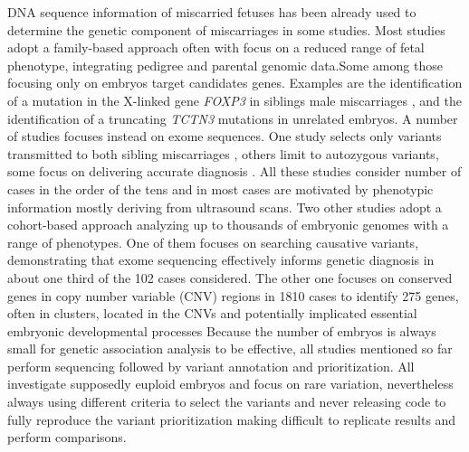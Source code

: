 DNA sequence information of miscarried fetuses has been already used to determine the genetic component of miscarriages in some studies\cite{rajcan2020next, filges2015exome}. Most studies adopt a family-based approach often with focus on a reduced range of fetal phenotype, integrating pedigree and parental genomic data\cite{bondeson2017nonsense, dohrn2015ecel1,wilbe2015musk, cristofoli2017novel}.Some among those focusing only on embryos target candidates genes. Examples are the identification of a mutation in the X-linked gene \textit{FOXP3} in siblings male miscarriages \cite{rae2015novel}, and the identification of a truncating \textit{TCTN3} mutations in unrelated embryos\cite{thomas2012tctn3}. A number of studies focuses instead on exome sequences\cite{shamseldin2015identification, qiao2016whole,fu2018whole, meier2019exome, yates2017whole}. One study selects only variants transmitted to both sibling miscarriages \cite{qiao2016whole}, others limit to autozygous variants\cite{thomas2012tctn3, shamseldin2015identification}, some focus on delivering accurate diagnosis \cite{meier2019exome}. All these studies consider number of cases in the order of the tens and in most cases are motivated by phenotypic information mostly deriving from ultrasound scans. 
Two other studies adopt a cohort-based approach analyzing up to thousands of embryonic genomes with a range of phenotypes\cite{chen2017characterization,zhao2020exome}. One of them focuses on  searching causative variants, demonstrating that exome sequencing effectively informs genetic diagnosis in about one third of the 102 cases considered\cite{zhao2020exome}. The other one focuses on conserved genes in copy number variable (CNV) regions in 1810 cases to identify 275 genes, often in clusters, located in the CNVs and potentially implicated essential embryonic developmental processes\cite{chen2017characterization}
Because the number of embryos is always small for genetic association analysis to be effective, all studies mentioned so far perform sequencing followed by variant annotation and prioritization. All investigate supposedly euploid embryos and focus on rare variation, nevertheless always using different criteria to select the variants and never releasing code to fully reproduce the variant prioritization making difficult to replicate results and perform comparisons.  



